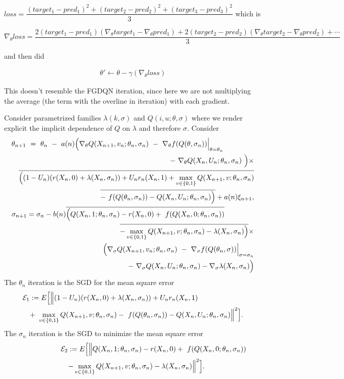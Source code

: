 \documentclass{article}
\theoremstyle{definition}
\begin{document}
$loss = \dfrac{(target_1-pred_1)^2+(target_2-pred_2)^2+(target_3-pred_3)^2}{3}$
which is 

$\nabla_\theta loss = \dfrac{2(target_1-pred_1)(\nabla_\theta target_1-\nabla_\theta pred_1)+2(target_2-pred_2)(\nabla_\theta target_2-\nabla_\theta pred_2)+\cdots}{3}$

and then did

\begin{align*}
\theta' \leftarrow \theta - \gamma(\nabla_\theta loss)
\end{align*}
    
This doesn't resemble the FGDQN iteration, since here we are not multiplying the average (the term with the overline in iteration) with each gradient.
    
    
    
    
    
    
    
    
\clearpage
Consider parametrized families $\lambda(k,\sigma)$ and $Q(i , u; \theta, \sigma)$ where we render explicit the implicit dependence of $Q$ on $\lambda$ and therefore $\sigma$. Consider
\begin{eqnarray*}
\lefteqn{\theta_{n+1} \ = \  \theta_n \ - \  a(n)\Big(\nabla_\theta Q(X_{n+1},v_n;\theta_n,\sigma_n) \ - \ \nabla_\theta f(Q(\theta,\sigma_n))\Big|_{\theta = \theta_n} }\\
&& - \ \nabla_\theta Q(X_n,U_n;\theta_n,\sigma_n) \ \Big)\times  \\
&&\overline{\Big((1-U_n)(r(X_n,0) + \lambda(X_n,\sigma_n)) + U_nr_n(X_n,1) + \max_{v\in\{0,1\}}Q(X_{n+1},v;\theta_n,\sigma_n)}\\
&&\overline{ - \ f(Q(\theta_n,\sigma_n)) - Q(X_n,U_n;\theta_n,\sigma_n)\Big)} + a(n) \xi_{n+1},\\
\lefteqn{\sigma_{n+1} = \sigma_n - b(n)\overline{\Big(Q(X_n, 1;\theta_n,\sigma_n) - r(X_n,0)  + \ f(Q(X_n,0;\theta_n,\sigma_n))}}\\
&& \overline{- \max_{v\in\{0,1\}}Q(X_{n+1},v;\theta_n,\sigma_n) - \lambda(X_n,\sigma_n)\Big)} \times \\
&& \Big(\nabla_\sigma Q(X_{n+1},v_n;\theta_n,\sigma_n) \ - \ \nabla_\sigma f(Q(\theta_n,\sigma))\Big|_{\sigma = \sigma_n} \\
&& - \ \nabla_\sigma Q(X_n,U_n;\theta_n,\sigma_n) - \nabla_\sigma\lambda(X_n,\sigma_n)\Big)
\end{eqnarray*}
The $\theta_n$ iteration is the SGD for the mean square error
\begin{eqnarray*}
\lefteqn{\mathcal{E}_1 := E\Big[\Big\|(1-U_n)(r(X_n,0) + \lambda(X_n,\sigma_n)) + U_nr_n(X_n,1) }\\
&&+ \ \max_{v\in\{0,1\}}Q(X_{n+1},v;\theta_n,\sigma_n)
 - \ f(Q(\theta_n,\sigma_n)) - Q(X_n,U_n;\theta_n,\sigma_n)\Big\|^2\Big].
\end{eqnarray*}
The $\sigma_n$ iteration is the SGD to minimize the mean square error
\begin{eqnarray*}
\lefteqn{\mathcal{E}_2 := E\Big[\Big\|Q(X_n, 1;\theta_n,\sigma_n) - r(X_n,0)  + \ f(Q(X_n,0;\theta_n,\sigma_n))}\\
&& - \max_{v\in\{0,1\}}Q(X_{n+1},v;\theta_n,\sigma_n) - \lambda(X_n,\sigma_n)\Big\|^2\Big].
\end{eqnarray*}
\clearpage
\end{document}
